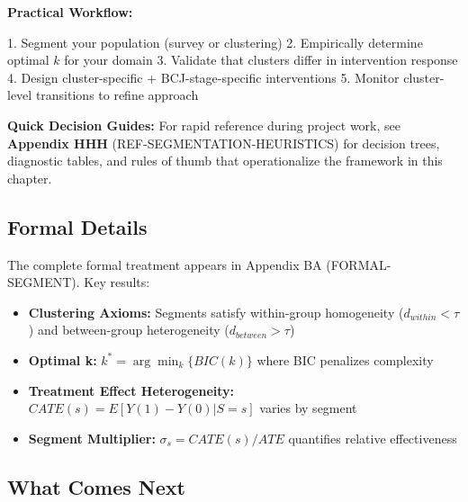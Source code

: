 \begin{tcolorbox}[colback=green!10!white, colframe=green!75!black,
    title=\textbf{Chapter 14: Summary}]
\begin{enumerate}
\end{enumerate}

\textbf{Practical Workflow:}
\begin{itemize}[nosep]
    1. Segment your population (survey or clustering)
    2. Empirically determine optimal $k$ for your domain
    3. Validate that clusters differ in intervention response
    4. Design cluster-specific + BCJ-stage-specific interventions
    5. Monitor cluster-level transitions to refine approach
\end{itemize}

\vspace{0.5em}

\textbf{Quick Decision Guides:} For rapid reference during project work, see \textbf{Appendix HHH} (REF-SEGMENTATION-HEURISTICS) for decision trees, diagnostic tables, and rules of thumb that operationalize the framework in this chapter.

\end{tcolorbox}

\subsection{Formal Details}
\label{sec:ch14-formal}

The complete formal treatment appears in Appendix BA (FORMAL-SEGMENT). Key results:

\begin{itemize}[nosep]
    \item \textbf{Clustering Axioms:} Segments satisfy within-group homogeneity ($d_{within} < \tau$) and between-group heterogeneity ($d_{between} > \tau$)
    \item \textbf{Optimal k:} $k^* = \arg\min_k \{ BIC(k) \}$ where BIC penalizes complexity
    \item \textbf{Treatment Effect Heterogeneity:} $CATE(s) = E[Y(1) - Y(0) | S = s]$ varies by segment
    \item \textbf{Segment Multiplier:} $\sigma_s = CATE(s) / ATE$ quantifies relative effectiveness
\end{itemize}

\subsection{What Comes Next}
\label{sec:ch14-next}


